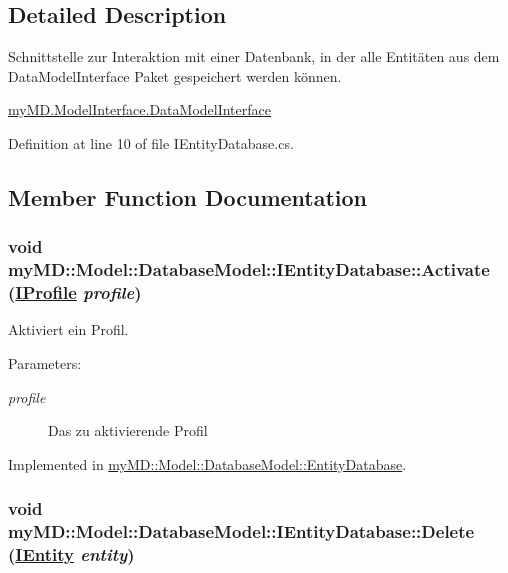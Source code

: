 \subsection{Detailed Description}
Schnittstelle zur Interaktion mit einer Datenbank, in der alle Entit\"{a}ten aus dem Data\-Model\-Interface Paket gespeichert werden k\"{o}nnen. 

\hyperlink{namespacemy_m_d_1_1_model_interface_1_1_data_model_interface}{my\-MD.Model\-Interface.Data\-Model\-Interface}



Definition at line 10 of file IEntity\-Database.cs.

\subsection{Member Function Documentation}
\hypertarget{interfacemy_m_d_1_1_model_1_1_database_model_1_1_i_entity_database_6ffa7bbff9bc4db881433251a158fbd0}{
\subsubsection[Activate]{\setlength{\rightskip}{0pt plus 5cm}void my\-MD::Model::Database\-Model::IEntity\-Database::Activate (\hyperlink{interfacemy_m_d_1_1_model_interface_1_1_data_model_interface_1_1_i_profile}{IProfile} {\em profile})}}
\label{d3/da9/interfacemy_m_d_1_1_model_1_1_database_model_1_1_i_entity_database_6ffa7bbff9bc4db881433251a158fbd0}


Aktiviert ein Profil. 

\begin{Desc}
\item[Parameters:]
\begin{description}
\item[{\em profile}]Das zu aktivierende Profil\end{description}
\end{Desc}


Implemented in \hyperlink{classmy_m_d_1_1_model_1_1_database_model_1_1_entity_database_6ffa7bbff9bc4db881433251a158fbd0}{my\-MD::Model::Database\-Model::Entity\-Database}.\hypertarget{interfacemy_m_d_1_1_model_1_1_database_model_1_1_i_entity_database_1ec3022b27f9091440cb495f510d25b0}{
\subsubsection[Delete]{\setlength{\rightskip}{0pt plus 5cm}void my\-MD::Model::Database\-Model::IEntity\-Database::Delete (\hyperlink{interfacemy_m_d_1_1_model_interface_1_1_data_model_interface_1_1_i_entity}{IEntity} {\em entity})}}
\label{d3/da9/interfacemy_m_d_1_1_model_1_1_database_model_1_1_i_entity_database_1ec3022b27f9091440cb495f510d25b0}


